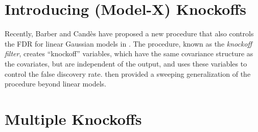 \documentclass[11pt,reqno]{report}
\theoremstyle{definition}
\numberwithin{equation}{section}
\begin{document}
\chapter{Introducing (Model-X) Knockoffs}
\label{chapter2}
Recently, Barber and Cand\`{e}s have proposed a new procedure that also controls the FDR for linear Gaussian models in \cite{knockoffs}. The procedure, known as the \emph{knockoff filter}, creates ``knockoff'' variables, which have the same covariance structure as the covariates, but are independent of the output, and uses these variables to control the false discovery rate. \cite{panning} then provided a sweeping generalization of the procedure beyond linear models.


\chapter{Multiple Knockoffs}
\label{chapter3}
\end{document}
